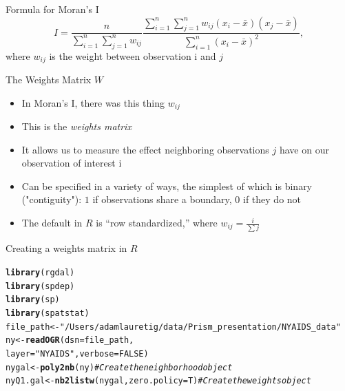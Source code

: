 \documentclass[aspectratio = 169, 12pt]{beamer}\usepackage[]{graphicx}\usepackage[]{color}
\makeatletter
\newcommand{\hlnum}[1]{\textcolor[rgb]{0.686,0.059,0.569}{#1}}%
\newcommand{\hlstr}[1]{\textcolor[rgb]{0.192,0.494,0.8}{#1}}%
\newcommand{\hlcom}[1]{\textcolor[rgb]{0.678,0.584,0.686}{\textit{#1}}}%
\newcommand{\hlstd}[1]{\textcolor[rgb]{0.345,0.345,0.345}{#1}}%
\newcommand{\hlkwb}[1]{\textcolor[rgb]{0.69,0.353,0.396}{#1}}%
\newcommand{\hlkwc}[1]{\textcolor[rgb]{0.333,0.667,0.333}{#1}}%
\newcommand{\hlkwd}[1]{\textcolor[rgb]{0.737,0.353,0.396}{\textbf{#1}}}%
\newenvironment{kframe}{%
 \def\at@end@of@kframe{}%
 \ifinner\ifhmode%
  \def\at@end@of@kframe{\end{minipage}}%
  \begin{minipage}{\columnwidth}%
 \fi\fi%
 \def\FrameCommand##1{\hskip\@totalleftmargin \hskip-\fboxsep
 \colorbox{shadecolor}{##1}\hskip-\fboxsep
     \hskip-\linewidth \hskip-\@totalleftmargin \hskip\columnwidth}%
 \MakeFramed {\advance\hsize-\width
   \@totalleftmargin\z@ \linewidth\hsize
   \@setminipage}}%
 {\par\unskip\endMakeFramed%
 \at@end@of@kframe}
\newenvironment{knitrout}{}{} %
\makeatother
\begin{document}
\begin{frame}{Formula for Moran's I}
\begin{equation*}
I = \frac{n}{\sum_{i=1}^n \sum_{j=1}^n w_{ij}}
\frac{\displaystyle\sum_{i=1}^n \sum_{j=1}^n w_{ij}(x_i - \bar{x})(x_j -
  \bar{x})}{\displaystyle\sum_{i=1}^n (x_i - \bar{x})^2},\label{eq:morani}
\end{equation*}
where $w_{ij}$ is the weight between observation i and $j$
\end{frame}

\begin{frame}{The Weights Matrix $W$}
\begin{itemize}
\item In Moran's I, there was this thing $w_{ij}$
\item This is the \textit{weights matrix}
\item It allows us to measure the effect neighboring observations $j$ have on our observation of interest i
\item Can be specified in a variety of ways, the simplest of which is binary ("contiguity"): $1$ if observations share a boundary, $0$ if they do not
\item The default in $R$ is ``row standardized,'' where $w_{ij} = \frac{i}{\sum j}$
\end{itemize}
\end{frame}


\begin{frame}[fragile]{Creating a weights matrix in $R$}
\begin{knitrout}\tiny
{}\color{fgcolor}\begin{kframe}
\begin{alltt}
\hlkwd{library}\hlstd{(rgdal)}
\hlkwd{library}\hlstd{(spdep)}
\hlkwd{library}\hlstd{(sp)}
\hlkwd{library}\hlstd{(spatstat)}
\hlstd{file_path} \hlkwb{<-} \hlstr{"/Users/adamlauretig/data/Prism_presentation/NYAIDS_data"}
\hlstd{ny} \hlkwb{<-} \hlkwd{readOGR}\hlstd{(}\hlkwc{dsn} \hlstd{= file_path,}
              \hlkwc{layer} \hlstd{=} \hlstr{"NYAIDS"}\hlstd{,} \hlkwc{verbose}\hlstd{=}\hlnum{FALSE}\hlstd{)}
\hlstd{nygal} \hlkwb{<-} \hlkwd{poly2nb}\hlstd{(ny)} \hlcom{#Create the neighborhood object}
\hlstd{nyQ1.gal} \hlkwb{<-} \hlkwd{nb2listw}\hlstd{(nygal,} \hlkwc{zero.policy}\hlstd{=T)} \hlcom{#Create the weights object}
\end{alltt}
\end{kframe}
\end{knitrout}
\end{frame}
\end{document}
